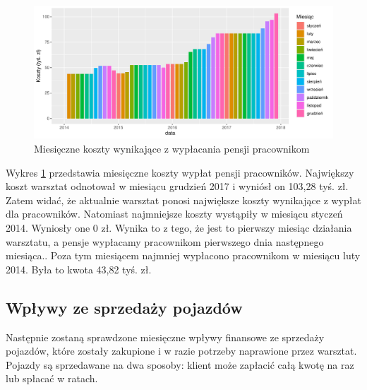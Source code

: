 \documentclass{article}\usepackage[]{graphicx}\usepackage[]{xcolor}
\makeatletter
\def\maxwidth{ %
  \ifdim\Gin@nat@width>\linewidth
    \linewidth
  \else
    \Gin@nat@width
  \fi
}
\newenvironment{knitrout}{}{} %
\makeatother
\begin{document}
\begin{knitrout}
\color{fgcolor}\begin{figure}[H]

{\centering \includegraphics[width=\maxwidth]{figure/fig_pracownicy-1} 

}

\caption[Miesięczne koszty wynikające z wypłacania pensji pracownikom]{Miesięczne koszty wynikające z wypłacania pensji pracownikom}\label{fig:fig_pracownicy}
\end{figure}

\end{knitrout}

Wykres \ref{fig:fig_pracownicy} przedstawia miesięczne koszty wypłat pensji pracowników. Największy koszt warsztat odnotował w miesiącu grudzień 2017 i wyniósł on 103,28 tyś. zł. Zatem widać, że aktualnie warsztat ponosi największe koszty wynikające z wypłat dla pracowników. 
Natomiast najmniejsze koszty wystąpiły w miesiącu styczeń 2014. Wyniosły one 0 zł. Wynika to z tego, że jest to pierwszy miesiąc działania warsztatu, a pensje wypłacamy pracownikom pierwszego dnia następnego miesiąca.. Poza tym miesiącem najmniej wypłacono pracownikom w miesiącu luty 2014. Była to kwota 43,82 tyś. zł.

\subsection{Wpływy ze sprzedaży pojazdów}

Następnie zostaną sprawdzone miesięczne wpływy finansowe ze sprzedaży pojazdów, które zostały zakupione i w razie potrzeby naprawione przez warsztat. Pojazdy są sprzedawane na dwa sposoby: klient może zapłacić całą kwotę na raz lub spłacać w ratach.
\end{document}
